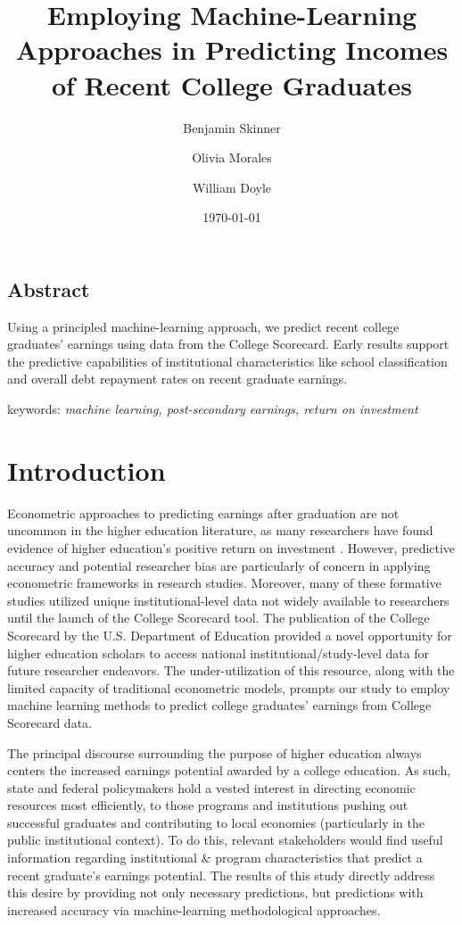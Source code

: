 \documentclass[a4paper, 12pt]{article}
\title{Employing Machine-Learning Approaches in Predicting Incomes of Recent College Graduates}
\author[1]{Benjamin Skinner}
\author[2]{Olivia Morales}
\author[3]{William Doyle}
\affil[1, 2]{University of Florida}
\affil[3]{Vanderbilt University}
\date{\today}
\begin{document}
\maketitle

\doublespacing

\begin{center}
\section*{Abstract}
\end{center}

Using a principled machine-learning approach, we predict recent
college graduates' earnings using data from the College
Scorecard. Early results support the predictive capabilities of
institutional characteristics like school classification and overall
debt repayment rates on recent graduate earnings.

\vspace{5mm}

keywords: \emph{machine learning, post-secondary earnings, return on investment}

\pagebreak
\section*{Introduction}

Econometric approaches to predicting earnings after graduation are not uncommon in the higher education literature, as many researchers have found evidence of higher education's positive return on investment \parencite{doyle2016educearn, card:1995, Card:1999, Card:2001, Oreopoulous_Petronijevic_2013}. However, predictive accuracy and potential researcher bias are particularly of concern in applying econometric frameworks in research studies. Moreover, many of these formative studies utilized unique institutional-level data not widely available to researchers until the launch of the College Scorecard tool. The publication of the College Scorecard by the U.S. Department of Education provided a novel opportunity for higher education scholars to access national institutional/study-level data for future researcher endeavors. The under-utilization of this resource, along with the limited capacity of traditional econometric models, prompts our study to employ machine learning methods to predict college graduates' earnings from College Scorecard data.

The principal discourse surrounding the purpose of higher education always centers the increased earnings potential awarded by a college education. As such, state and federal policymakers hold a vested interest in directing economic resources most efficiently, to those programs and institutions pushing out successful graduates and contributing to local economies (particularly in the public institutional context). To do this, relevant stakeholders would find useful information regarding institutional \& program characteristics that  predict a recent graduate's earnings potential. The results of this study directly address this desire by providing not only necessary predictions, but predictions with increased accuracy via machine-learning methodological approaches. 
\end{document}
